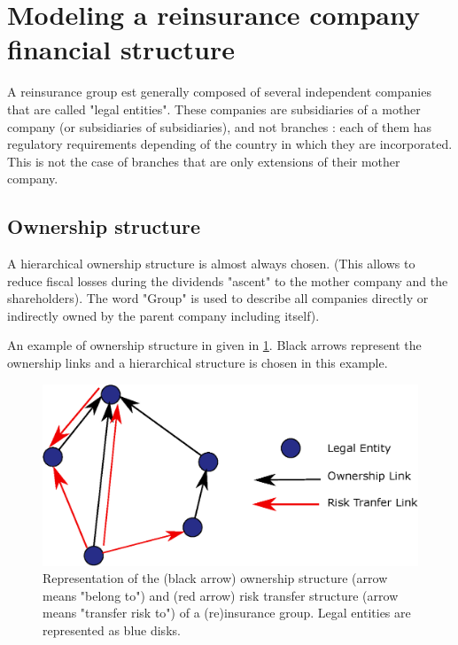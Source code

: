 \section{Modeling a reinsurance company financial structure}
\label{sec:COMPANY_DESCRIPTION}

A reinsurance group est generally composed of several independent companies that are called "legal entities". These companies are subsidiaries of a mother company (or subsidiaries of subsidiaries), and not branches : each of them has regulatory requirements depending of the country in which they are incorporated. This is not the case of branches that are only extensions of their mother company.

\subsection{Ownership structure}
\label{sec:OWNERSHIP}


A hierarchical ownership structure is almost always chosen. (This allows to reduce fiscal losses during the dividends "ascent" to the mother company and the shareholders). The word "Group" is used to describe all companies directly or indirectly owned by the parent company including itself).

An example of ownership structure in given in \ref{fig:GROUP_STRUCTURE}. Black arrows represent the ownership links and a hierarchical structure is chosen in this example.

\begin{figure}
\centering
  \includegraphics[width=\linewidth]{images/part1/group_structure.eps}
  \caption{Representation of the (black arrow) ownership structure (arrow means "belong to") and (red arrow) risk transfer structure (arrow means "transfer risk to") of a (re)insurance group. Legal entities are represented as blue disks.}
  \label{fig:GROUP_STRUCTURE}
\end{figure}



